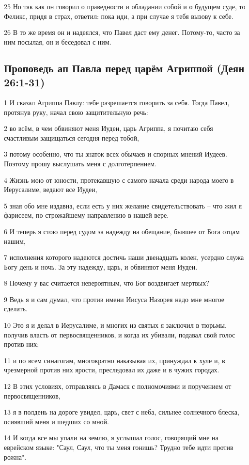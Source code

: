 25 Но так как он говорил о праведности и обладании собой и о будущем суде, то Феликс, придя в страх, ответил: пока иди, а при случае я тебя вызову к себе.

26 В то же время он и надеялся, что Павел даст ему денег. Потому-то, часто за ним посылая, он и беседовал с ним.

\subsection*{Проповедь ап Павла перед царём Агриппой (Деян 26:1-31)}
1 И сказал Агриппа Павлу: тебе разрешается говорить за себя. Тогда Павел, протянув руку, начал свою защитительную речь:

2 во всём, в чем обвиняют меня Иудеи, царь Агриппа, я почитаю себя счастливым защищаться сегодня перед тобой,

3 потому особенно, что ты знаток всех обычаев и спорных мнений Иудеев. Поэтому прошу выслушать меня с долготерпением.

4 Жизнь мою от юности, протекавшую с самого начала среди народа моего в Иерусалиме, ведают все Иудеи,

5 зная обо мне издавна, если есть у них желание свидетельствовать – что жил я фарисеем, по строжайшему направлению в нашей вере.

6 И теперь я стою перед судом за надежду на обещание, бывшее от Бога отцам нашим,

7 исполнения которого надеются достичь наши двенадцать колен, усердно служа Богу день и ночь. За эту надежду, царь, и обвиняют меня Иудеи.

8 Почему у вас считается невероятным, что Бог воздвигает мертвых?

9 Ведь я и сам думал, что против имени Иисуса Назорея надо мне многое сделать.

10 Это я и делал в Иерусалиме, и многих из святых я заключил в тюрьмы, получив власть от первосвященников, и когда их убивали, подавал свой голос против них;

11 и по всем синагогам, многократно наказывая их, принуждал к хуле и, в чрезмерной против них ярости, преследовал их даже и в чужих городах.

12 В этих условиях, отправляясь в Дамаск с полномочиями и поручением от первосвященников,

13 я в полдень на дороге увидел, царь, свет с неба, сильнее солнечного блеска, осиявший меня и шедших со мной.

14 И когда все мы упали на землю, я услышал голос, говорящий мне на еврейском языке: "Саул, Саул, что ты меня гонишь? Трудно тебе идти против рожна".

